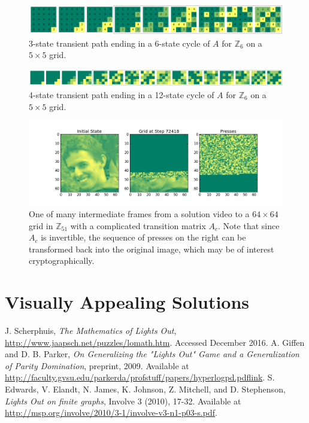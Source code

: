 \documentclass[11pt]{article}
\newcommand{\modZ}[1]{$\mathbb{Z}_{#1}$}
\begin{document}
\begin{figure}
  \caption{3-state transient path ending in a 6-state cycle of $A$ for \modZ{6} on a $5 \times 5$ grid.}
  \label{655-transient}
  \includegraphics[width=\textwidth]{655-transient.png}
\end{figure}

\begin{figure}
  \caption{4-state transient path ending in a 12-state cycle of $A$ for \modZ{6} on a $5 \times 5$ grid.}
  \label{655-transient-long}
  \includegraphics[width=\textwidth]{655-transient-long.png}
\end{figure}

\begin{figure}
  \caption{One of many intermediate frames from a solution video to a $64 \times 64$ grid in \modZ{51} with a complicated transition matrix $A_c$. Note that since $A_c$ is invertible, the sequence of presses on the right can be transformed back into the original image, which may be of interest cryptographically.}
  \label{chr-solution}
  \includegraphics[width=\textwidth]{img000072418.png}
\end{figure}

\section*{Visually Appealing Solutions}

\clearpage

\begin{thebibliography}{9}
  J. Scherphuis, \textit{The Mathematics of Lights Out},
  \href{http://www.jaapsch.net/puzzles/lomath.htm}{http://www.jaapsch.net/puzzles/lomath.htm}.
  Accessed December 2016.
  A. Giffen and D. B. Parker, \textit{On Generalizing the "Lights Out" Game and a Generalization of Parity Domination}, preprint, 2009. Available at \href{http://faculty.gvsu.edu/parkerda/profstuff/papers/hyperlogpd.pdf}{http://faculty.gvsu.edu/parkerda/profstuff/papers/hyperlogpd.pdflink}.
  S. Edwards, V. Elandt, N. James, K. Johnson, Z. Mitchell, and D. Stephenson, \textit{Lights Out on finite graphs}, Involve 3 (2010), 17-32. Available at \href{http://msp.org/involve/2010/3-1/involve-v3-n1-p03-s.pdf}{http://msp.org/involve/2010/3-1/involve-v3-n1-p03-s.pdf}.
\end{thebibliography}
\end{document}
